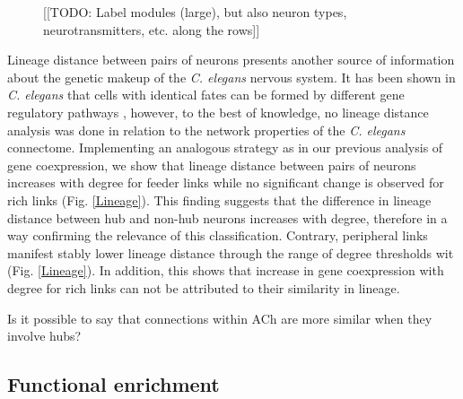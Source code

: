 \documentclass[10pt,letterpaper]{article}
\begin{document}
\begin{figure}[!h]
{%
[[TODO: Label modules (large), but also neuron types, neurotransmitters, etc. along the rows]]
}
 \label{fig:modules}
\end{figure}


Lineage distance between pairs of neurons presents another source of information about the genetic makeup of the \textit{C. elegans} nervous system.
It has been shown in \textit{C. elegans} that cells with identical fates can be formed by different gene regulatory pathways \citep{Liu2009}, however, to the best of knowledge, no lineage distance analysis was done in relation to the network properties of the \textit{C. elegans} connectome.
Implementing an analogous strategy as in our previous analysis of gene coexpression, we show that lineage distance between pairs of neurons increases with degree for feeder links while no significant change is observed for rich links (Fig. \ref{Lineage}).
This finding suggests that the difference in lineage distance between hub and non-hub neurons increases with degree, therefore in a way confirming the relevance of this classification.
Contrary, peripheral links manifest stably lower lineage distance through the range of degree thresholds wit (Fig. \ref{Lineage}).
In addition, this shows that increase in gene coexpression with degree for rich links can not be attributed to their similarity in lineage.

Is it possible to say that connections within ACh are more similar when they involve hubs?

\subsection*{Functional enrichment}
\end{document}
